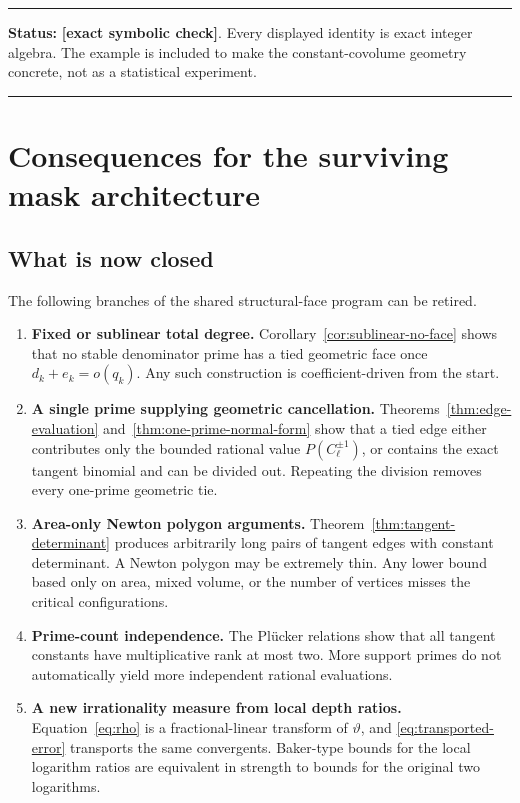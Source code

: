 \documentclass[11pt,oneside]{article}
\theoremstyle{definition}
\theoremstyle{remark}
\newcommand{\thetaq}{\vartheta}
\newcommand{\exactcheck}{\textcolor{exactviolet}{\textbf{[exact symbolic check]}}}
\newenvironment{statusbox}[1]
{\begin{center}\begin{minipage}{0.94\textwidth}\raggedright\hrule\vspace{0.45em}\textbf{Status:} #1\par\vspace{0.35em}}
{\vspace{0.35em}\hrule\end{minipage}\end{center}}
\begin{document}
\begin{statusbox}{\exactcheck.  Every displayed identity is exact integer algebra.  The
example is included to make the constant-covolume geometry concrete, not as a statistical
experiment.}
\end{statusbox}

\section{Consequences for the surviving mask architecture}
\label{sec:consequences}

\subsection{What is now closed}

The following branches of the shared structural-face program can be retired.

\begin{enumerate}
\item \textbf{Fixed or sublinear total degree.}
Corollary~\ref{cor:sublinear-no-face} shows that no stable denominator prime has a tied
geometric face once $d_k+e_k=o(q_k)$.  Any such construction is coefficient-driven from the
start.

\item \textbf{A single prime supplying geometric cancellation.}
Theorems~\ref{thm:edge-evaluation} and~\ref{thm:one-prime-normal-form} show that a tied edge
either contributes only the bounded rational value $P(C_\ell^{\pm1})$, or contains the exact
tangent binomial and can be divided out.  Repeating the division removes every one-prime
geometric tie.

\item \textbf{Area-only Newton polygon arguments.}
Theorem~\ref{thm:tangent-determinant} produces arbitrarily long pairs of tangent edges with
constant determinant.  A Newton polygon may be extremely thin.  Any lower bound based only
on area, mixed volume, or the number of vertices misses the critical configurations.

\item \textbf{Prime-count independence.}
The Pl\"ucker relations show that all tangent constants have multiplicative rank at most two.
More support primes do not automatically yield more independent rational evaluations.

\item \textbf{A new irrationality measure from local depth ratios.}
Equation~\eqref{eq:rho} is a fractional-linear transform of $\thetaq$, and
\eqref{eq:transported-error} transports the same convergents.  Baker-type bounds for the
local logarithm ratios are equivalent in strength to bounds for the original two logarithms.
\end{enumerate}
\end{document}
